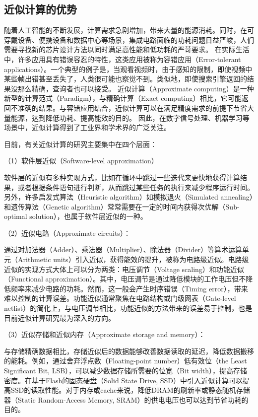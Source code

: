\subsection{近似计算的优势} \label{approximate_computing_advance}

随着人工智能的不断发展，计算需求急剧增加，带来大量的能源消耗。同时，在可穿戴设备、便携设备和数据中心等场景，集成电路面临的功耗问题日益严峻，人们需要寻找新的芯片设计方法以同时满足高性能和低功耗的严苛要求。
在实际生活中，许多应用具有错误容忍的特性，这类应用被称为容错应用（Error-tolerant applications）。一个典型的例子是，当观看视频时，由于感知的限制，即使视频中某些帧出错甚至丢失了，人类很可能也察觉不到。类似地，即使搜索引擎返回的结果没那么精确，查询者也可以接受。
近似计算（Approximate computing）是一种新型的计算范式（Paradigm），与精确计算（Exact computing）相比，它可能返回不准确的结果。与容错应用结合，近似计算可以在满足精度需求的前提下节省大量能源，达到降低功耗、提高能效的目的。
因此，在数字信号处理、机器学习等场景中，近似计算得到了工业界和学术界的广泛关注\cite{AC:survey:survey's_survey,AC:survey:hanjie_2013_ETS}。

目前，有关近似计算的研究主要集中在四个层面：

（1）软件层近似（Software-level approximation）

软件层的近似有多种实现方式，比如在循环中跳过一些迭代来更快地获得计算结果，或者根据条件语句进行判断，从而跳过某些任务的执行来减少程序运行时间。另外，许多启发式算法（Heuristic algorithm）如模拟退火（Simulated annealing）和遗传算法（Genetic algorithm）常常需要在一定的时间内获得次优解（Sub-optimal solution），也属于软件层近似的一种。

（2）近似电路（Approximate circuits）：

通过对加法器（Adder）\cite{AC:Aadd:simple_yet}、乘法器（Multiplier）\cite{AC:AM:Adapt}、除法器（Divider）\cite{AC:Div:2019dac}等算术运算单元（Arithmetic units）引入近似，获得能效的提升，被称为电路级近似。电路级近似的实现方式大体上可以分为两类：电压调节（Voltage scaling）和功能近似（Functional approximation）\cite{AC:ALS:survey}。其中，电压调节是通过降低模块的工作电压但不降低频率来减少电路的功耗。然而，这一般会产生时序错误（Timing error），带来难以控制的计算误差\cite{AC:Arith:overscale}。功能近似通常聚焦在电路结构或门级网表（Gate-level netlist）的简化上，与电压调节相比，功能近似的方法带来的误差易于控制，也是目前近似计算研究最为深入的方向\cite{AC:Arith:survey_hanjie}。

（3）近似存储和近似内存（Approximate storage and memory）：

与存储精确数据相比，存储近似后的数据能够改善数据读取的延迟，降低数据搬移的能耗。例如，通过舍弃浮点数（Floating-point number）低有效位（the Least Significant Bit, LSB），可以减少数据存储所需要的位宽（Bit width），提高存储密度。在基于Flash的固态硬盘（Solid State Drive, SSD）中引入近似计算可以提高SSD的读取性能\cite{AC:Store:ASCache}。对于内存或cache来说，降低DRAM的刷新率\cite{AC:Store:DRAM}或静态随机存储器（Static Random-Access Memory, SRAM）\cite{AC:Store:SRAM}的供电电压也可以达到节省功耗的目的。

